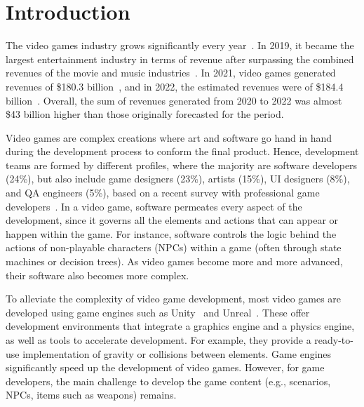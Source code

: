 \section{Introduction}
\label{sec:intro}


The video games industry grows significantly every year~\cite{rykala2020growth}. In 2019, it became the largest entertainment industry in terms of revenue after surpassing the combined revenues of the movie and music industries~\cite{politowski2021game}. In 2021, video games generated revenues of \$180.3 billion~\cite{wijman2021games}, and in 2022, the estimated revenues were of \$184.4 billion~\cite{wijman2022games}. Overall, the sum of revenues generated from 2020 to 2022 was almost \$43 billion higher than those originally forecasted for the period. 


Video games are complex creations where art and software go hand in hand during the development process to conform the final product. Hence, development teams are formed by different profiles, where the majority are software developers (24\%), but also include game designers (23\%), artists (15\%), UI designers (8\%), and QA engineers (5\%), based on a recent survey with professional game developers~\cite{devNation}. In a video game, software permeates every aspect of the development, since it governs all the elements and actions that can appear or happen within the game. For instance, software controls the logic behind the actions of non-playable characters (NPCs) within a game (often through state machines or decision trees). As video games become more and more advanced, their software also becomes more complex.

To alleviate the complexity of video game development, most video games are developed using game engines such as Unity~\cite{unityweb} and Unreal~\cite{unrealweb}. 
These offer development environments that integrate a graphics engine and a physics engine, as well as tools to accelerate development. For example, they provide a ready-to-use implementation of gravity or collisions between elements. Game engines significantly speed up the development of video games. However, for game developers, the main challenge to develop the game content (e.g., scenarios, NPCs, items such as weapons) remains. %

